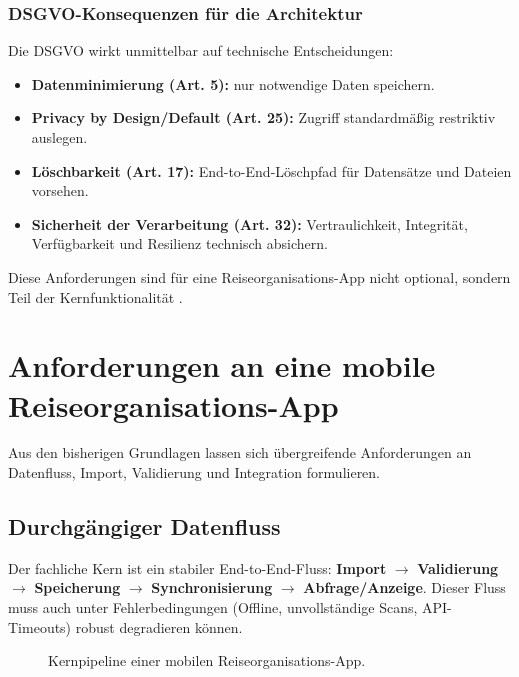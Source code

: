 \subsubsection{DSGVO-Konsequenzen für die Architektur}
Die DSGVO wirkt unmittelbar auf technische Entscheidungen:
\begin{itemize}
  \item \textbf{Datenminimierung (Art. 5):} nur notwendige Daten speichern.
  \item \textbf{Privacy by Design/Default (Art. 25):} Zugriff standardmäßig
  restriktiv auslegen.
  \item \textbf{Löschbarkeit (Art. 17):} End-to-End-Löschpfad für Datensätze
  und Dateien vorsehen.
  \item \textbf{Sicherheit der Verarbeitung (Art. 32):} Vertraulichkeit,
  Integrität, Verfügbarkeit und Resilienz technisch absichern.
\end{itemize}
Diese Anforderungen sind für eine Reiseorganisations-App nicht optional, sondern
Teil der Kernfunktionalität \cite{gdpr}.

\section{Anforderungen an eine mobile Reiseorganisations-App}

Aus den bisherigen Grundlagen lassen sich übergreifende Anforderungen an Datenfluss, Import, Validierung und Integration formulieren.

\subsection{Durchgängiger Datenfluss}
Der fachliche Kern ist ein stabiler End-to-End-Fluss:
\textbf{Import} $\rightarrow$ \textbf{Validierung} $\rightarrow$
\textbf{Speicherung} $\rightarrow$ \textbf{Synchronisierung} $\rightarrow$
\textbf{Abfrage/Anzeige}. Dieser Fluss muss auch unter Fehlerbedingungen
(Offline, unvollständige Scans, API-Timeouts) robust degradieren können.

\begin{figure}[H]
  \centering
  \caption{Kernpipeline einer mobilen Reiseorganisations-App.}
  \label{fig:core_pipeline}
\end{figure}

